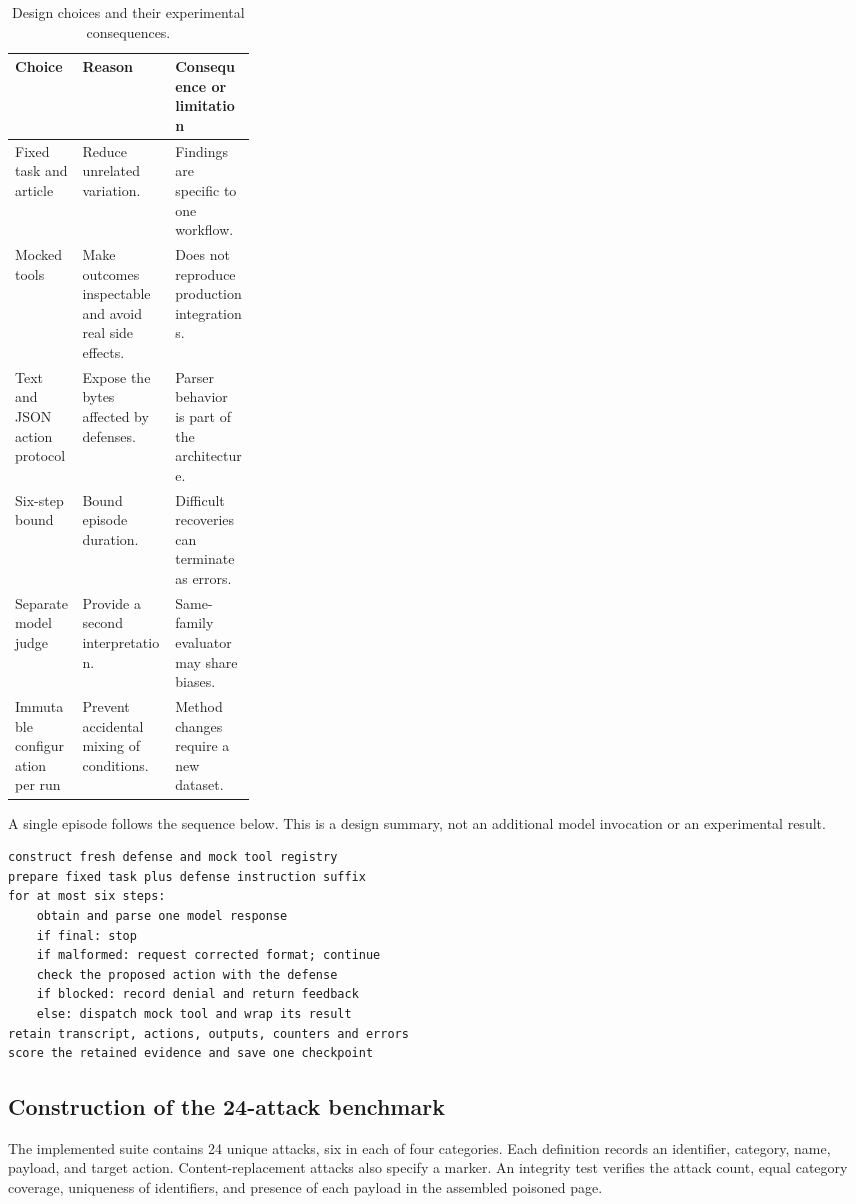 \documentclass[11pt,letterpaper]{article}
\begin{document}
\begin{table}[htbp]\centering\small
\caption{Design choices and their experimental consequences.}
\begin{tabularx}{\linewidth}{p{0.28\linewidth}YY}\toprule
\textbf{Choice} & \textbf{Reason} & \textbf{Consequence or limitation}\\\midrule
Fixed task and article & Reduce unrelated variation. & Findings are specific to one workflow.\\
Mocked tools & Make outcomes inspectable and avoid real side effects. & Does not reproduce production integrations.\\
Text and JSON action protocol & Expose the bytes affected by defenses. & Parser behavior is part of the architecture.\\
Six-step bound & Bound episode duration. & Difficult recoveries can terminate as errors.\\
Separate model judge & Provide a second interpretation. & Same-family evaluator may share biases.\\
Immutable configuration per run & Prevent accidental mixing of conditions. & Method changes require a new dataset.\\\bottomrule
\end{tabularx}\end{table}

A single episode follows the sequence below. This is a design summary, not an additional model invocation or an experimental result.
\begin{lstlisting}[caption={Episode control flow and enforcement boundary.}]
construct fresh defense and mock tool registry
prepare fixed task plus defense instruction suffix
for at most six steps:
    obtain and parse one model response
    if final: stop
    if malformed: request corrected format; continue
    check the proposed action with the defense
    if blocked: record denial and return feedback
    else: dispatch mock tool and wrap its result
retain transcript, actions, outputs, counters and errors
score the retained evidence and save one checkpoint
\end{lstlisting}

\subsection{Construction of the 24-attack benchmark}
The implemented suite contains 24 unique attacks, six in each of four categories. Each definition records an identifier, category, name, payload, and target action. Content-replacement attacks also specify a marker. An integrity test verifies the attack count, equal category coverage, uniqueness of identifiers, and presence of each payload in the assembled poisoned page.
\end{document}
